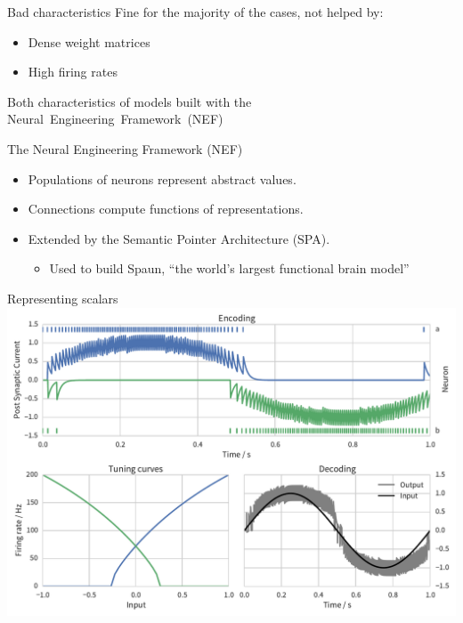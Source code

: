 \documentclass[handout,t]{beamer}
\begin{document}
  \begin{frame}{Bad characteristics}
    Fine for the majority of the cases, not helped by:
    \begin{itemize}
      \item Dense weight matrices
      \item High firing rates
    \end{itemize}
    \pause
    Both characteristics of models built with the Neural~Engineering~Framework~(NEF)
  \end{frame}

  \begin{frame}{The Neural Engineering Framework (NEF)}
    \begin{itemize}
      \item Populations of neurons represent abstract values.
      \item Connections compute functions of representations.
      \item Extended by the Semantic Pointer Architecture (SPA).
        \begin{itemize}
          \item Used to build Spaun, ``the world's largest functional brain model''
        \end{itemize}
    \end{itemize}
  \end{frame}

  \begin{frame}[plain]{Representing scalars}
    \vfill
    \includegraphics[width=\textwidth]{encoding_decoding}
    \vfill
  \end{frame}
\end{document}
